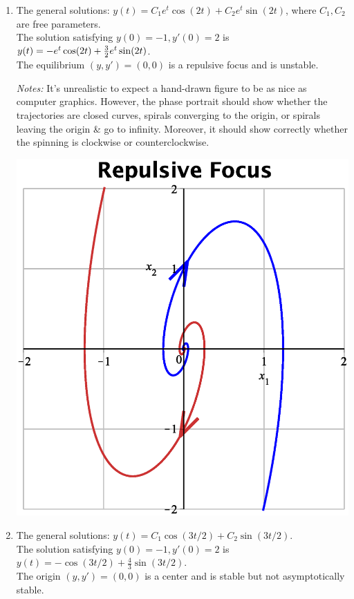 \begin{enumerate}
	\item  
The general solutions: 
$\displaystyle y(t)=C_1 e^t\cos(2t)   +C_2 e^t\sin(2t)$,
where $C_1,C_2$ are free parameters.\\
The solution satisfying $y(0)=-1,y'(0)=2$ is
$y(t)= -e^t\cos(2t)   +{3\over 2} e^t\sin(2t)$.\\
The equilibrium $(y,y')=(0,0)$ is a repulsive focus
and is unstable.
\medskip

\begin{minipage}{0.6\textwidth}
{\color{red}\small\em Notes:}
	{\small \color{blue}
It's unrealistic to expect a hand-drawn figure 
to be as nice as computer graphics.
However, the phase portrait should show 
whether the trajectories are closed curves, 
spirals converging to the origin, 
or spirals leaving the origin \& go to infinity. 
Moreover, it should show correctly 
whether the spinning is clockwise or counterclockwise.}
\end{minipage}
\hfil
\begin{minipage}{0.3\textwidth}
\centerline{\includegraphics*[width=\textwidth]{testpr-2nd-ord-eq-repul-focus.eps} }
\end{minipage}
\medskip
 
	\item  
The general solutions: 
$\displaystyle y(t)=C_1  \cos(3t/2)   +C_2 \sin(3t/2)$.\\
The solution satisfying $y(0)=-1,y'(0)=2$ is
$y(t)= -\cos(3t/2) +\frac{4}{3}\sin(3t/2)$.\\
The origin $(y,y')=(0,0)$ is a center
and is stable but not asymptotically stable.
\medskip


\end{enumerate}
